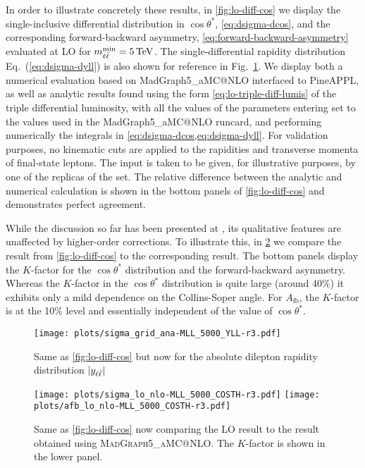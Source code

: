 In order to illustrate concretely these results,  
in \cref{fig:lo-diff-cos} we display the
single-inclusive differential distribution in $\cos\theta^*$,
\cref{eq:dsigma-dcos},
and the corresponding forward-backward asymmetry,
\cref{eq:forward-backward-asymmetry} evaluated at LO
for $\mll^{\text{min}}=\SI{5}{\TeV}$. The single-differential rapidity
distribution Eq.~(\ref{eq:dsigma-dyll}) is also shown for reference in Fig.~\ref{fig:lo-diff-yll}.
%
We display both a numerical  evaluation based on
 {\sc\small MadGraph5\_aMC@NLO}
interfaced to {\sc\small
  PineAPPL},
as well as analytic results found using the form \cref{eq:lo-triple-diff-lumis} of the triple
differential luminosity, with all the values of the parameters
entering  set to the values used in
the {\sc\small MadGraph5\_aMC@NLO} runcard, and performing  numerically
the integrals in \cref{eq:dsigma-dcos,eq:dsigma-dyll}.
%
For validation purposes, no kinematic cuts are applied to the rapidities and
transverse momenta of final-state leptons.
The \pdf input is taken to be given, for illustrative purposes, by one of the
replicas of the  \nnlo set.
The relative difference between the analytic and numerical calculation is shown
in the bottom panels of \cref{fig:lo-diff-cos} and demonstrates perfect
agreement. 

While the discussion so far has been presented  at \lo, its qualitative
features are unaffected by  higher-order corrections.
%
To illustrate this, in \cref{fig:lo-kfact} we compare the \lo result  from
\cref{fig:lo-diff-cos} to the corresponding \nlo \qcd result.
%
The bottom panels display the \nlo $K$-factor for the $\cos\theta^*$
distribution and the forward-backward asymmetry.
%
Whereas the \nlo $K$-factor in the $\cos\theta^*$ distribution is quite large
(around 40\%) it exhibits only a mild dependence on the Collins-Soper angle.
%
For $A_{\text{fb}}$, the $K$-factor is at the 10\% level and essentially
independent of the value of $\cos\theta^*$.

\begin{figure}[t]
  \centering
  \texttt{[image: plots/sigma\_grid\_ana-MLL\_5000\_YLL-r3.pdf]}
  \caption{Same as \cref{fig:lo-diff-cos} but now for the absolute dilepton rapidity distribution $|y_{\ell\bar{\ell}}|$}
  \label{fig:lo-diff-yll}
\end{figure}
 
\begin{figure}[t]
  \centering
  \texttt{[image: plots/sigma\_lo\_nlo-MLL\_5000\_COSTH-r3.pdf]}
  \texttt{[image: plots/afb\_lo\_nlo-MLL\_5000\_COSTH-r3.pdf]}
  \caption{Same as \cref{fig:lo-diff-cos} now comparing the LO result
    to the \nlo \qcd result obtained using
    \textsc{\small MadGraph5\_aMC@NLO}.
    The $K$-factor is shown in the lower panel.
  }
  \label{fig:lo-kfact}
\end{figure}
